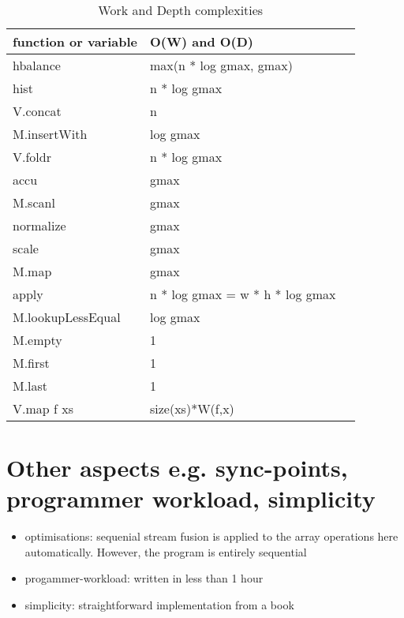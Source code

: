 \documentclass{article}
\begin{document}
      \paragraph{}
        \begin{table}[h]
          \caption{Work and Depth complexities}
          \label{timetable}
          \begin{tabular}{lll}
              \toprule
              function or variable &  O(W) and O(D) \\
              \midrule
              hbalance          & max(n * log gmax, gmax) \\
              \midrule
              hist              & n * log gmax\\
              V.concat          & n\\ 
              M.insertWith      & log gmax\\ 
              V.foldr           & n * log gmax \\ 
              \midrule
              accu              & gmax\\ 
              M.scanl           & gmax\\
              \midrule
              normalize         & gmax\\ 
              scale             & gmax\\ 
              M.map             & gmax\\ 
              \midrule
              apply             & n * log gmax = w * h * log gmax \\
              M.lookupLessEqual & log gmax \\ 
              \midrule
              M.empty           & 1\\ 
              M.first           & 1\\ 
              M.last            & 1\\
              \midrule
              V.map f xs        & size(xs)*W(f,x)\\ 
          \end{tabular}
        \end{table}
      
    \section{Other aspects \small{e.g. sync-points, programmer workload, simplicity}}
      \begin{itemize}
        \item optimisations: sequenial stream fusion is applied to the array operations here
            automatically. However, the program is entirely sequential
        \item progammer-workload: written in less than 1 hour
        \item simplicity: straightforward implementation from a book
      \end{itemize}
      
\end{document}
